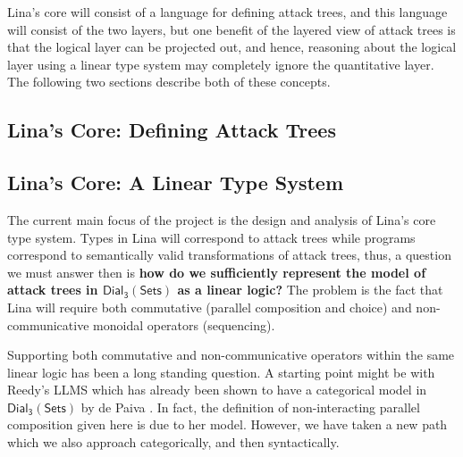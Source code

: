 \documentclass{llncs}
\newcommand{\dial}[0]{\mathsf{Dial_3}(\mathsf{Sets})}
\begin{document}
Lina's core will consist of a language for defining attack trees, and
this language will consist of the two layers, but one benefit of the
layered view of attack trees is that the logical layer can be
projected out, and hence, reasoning about the logical layer using a
linear type system may completely ignore the quantitative layer.  The
following two sections describe both of these concepts.

\subsection{Lina's Core: Defining Attack Trees}
\label{subsec:linas_core_defining_attack_trees}




\subsection{Lina's Core: A Linear Type System}
\label{subsec:linas_core_linear_type_system}

The current main focus of the project is the design and analysis of
Lina's core type system.  Types in Lina will correspond to attack
trees while programs correspond to semantically valid transformations
of attack trees, thus, a question we must answer then is \textbf{how
  do we sufficiently represent the model of attack trees in $\dial$ as
  a linear logic?}  The problem is the fact that Lina will require
both commutative (parallel composition and choice) and
non-communicative monoidal operators (sequencing).

Supporting both commutative and non-communicative operators within the
same linear logic has been a long standing question.  A starting point
might be with Reedy's LLMS which has already been shown to have a
categorical model in $\dial$ by de Paiva \cite{dePaiva:2014a}.  In
fact, the definition of non-interacting parallel composition given
here is due to her model.  However, we have taken a new path which we
also approach categorically, and then syntactically.

\end{document}
